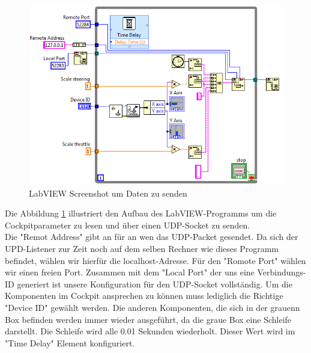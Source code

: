 \begin{figure}[H]
\centering 
\includegraphics[width=1\linewidth]{src/labview_screenshot_videoplayer_daten_senden.png}
\caption{LabVIEW Screenshot um Daten zu senden} %
\label{labview_screenshot_videoplayer_daten_senden} %
\end{figure}
Die Abbildung \ref{labview_screenshot_videoplayer_daten_senden} illustriert den Aufbau des LabVIEW-Programms um die Cockpitparameter zu lesen und über einen UDP-Socket zu senden.\\
Die "Remot Address" gibt an für an wen das UDP-Packet gesendet. Da sich der UPD-Listener zur Zeit noch auf dem selben Rechner wie dieses Programm befindet, wählen wir hierfür die localhost-Adresse. Für den "Romote Port" wählen wir einen freien Port. Zusammen mit dem "Local Port" der uns eine Verbindungs-ID generiert ist unsere Konfiguration für den UDP-Socket vollständig. Um die Komponenten im Cockpit ansprechen zu können muss lediglich die Richtige "Device ID" gewählt werden. Die anderen Komponenten, die sich in der grauenn Box befinden werden immer wieder ausgeführt, da die graue Box eine Schleife darstellt. Die Schleife wird alle 0.01 Sekunden wiederholt. Dieser Wert wird im "Time Delay" Element konfiguriert. \\
